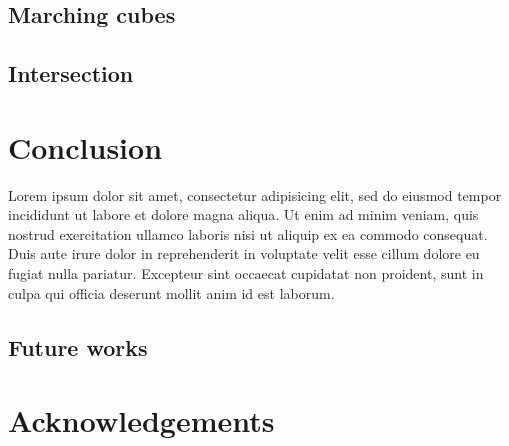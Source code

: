 \documentclass[conference]{acmsiggraph}
\begin{document}
\subsection{Marching cubes}

\subsection{Intersection}

\section{Conclusion}

Lorem ipsum dolor sit amet, consectetur adipisicing elit, sed do
eiusmod tempor incididunt ut labore et dolore magna aliqua. Ut enim ad
minim veniam, quis nostrud exercitation ullamco laboris nisi ut
aliquip ex ea commodo consequat. Duis aute irure dolor in
reprehenderit in voluptate velit esse cillum dolore eu fugiat nulla
pariatur. Excepteur sint occaecat cupidatat non proident, sunt in
culpa qui officia deserunt mollit anim id est laborum.

\subsection{Future works}

\section*{Acknowledgements}




\end{document}
